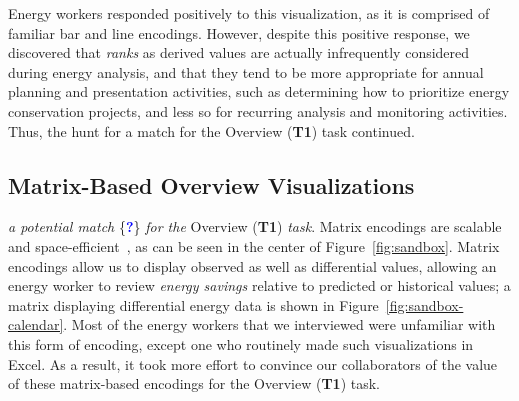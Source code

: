 \documentclass[journal]{vgtc}                %
\newcommand*\posmatch{\textcolor{blue}{{\bf ?}}}
\newcommand{\bstart}[1]{\vspace{1mm} \noindent{\textbf{#1:}}}
\newcommand{\jn}[1]{\textcolor{darkGreen}{#1}}
\begin{document}
Energy workers responded positively to this visualization, as it is comprised of familiar bar and line encodings. 
However, despite this positive response, we discovered that {\it ranks} as derived values are actually infrequently considered during energy analysis, and that they tend to be more appropriate for annual planning and presentation activities, such as determining how to prioritize energy conservation projects, and less so for recurring analysis and monitoring activities.
Thus, the hunt for a match for the Overview ({\bf T1}) task continued.


\subsection{Matrix-Based Overview Visualizations}
\label{design-matrix}


\bstart{Time series matrix} {\it a potential match} \{\posmatch\} {\it for the} Overview ({\bf T1}) {\it task}.
Matrix encodings are scalable and space-efficient~\cite{Goodwin2013,Hao2007}, as can be seen in the center of Figure~\ref{fig:sandbox}.
Matrix encodings allow us to display observed as well as differential values, allowing an energy worker to review {\it energy savings} relative to predicted or historical values; a matrix displaying differential energy data is shown in Figure~\ref{fig:sandbox-calendar}. 
Most of the energy workers that we interviewed were unfamiliar with this form of encoding, except one who routinely made such visualizations in Excel. 
As a result, it took more effort to convince our collaborators of the value of these matrix-based encodings for the Overview ({\bf T1}) task.
\end{document}
